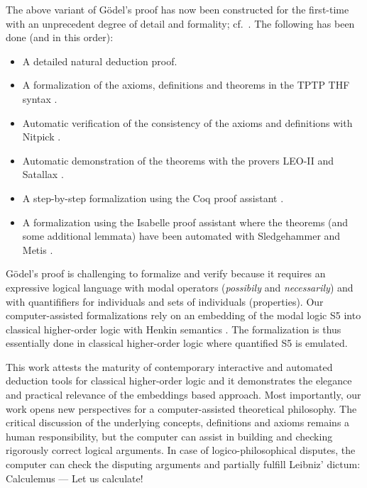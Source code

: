 \documentclass{llncs}
\begin{document}

The above variant of G\"{o}del's proof has now been 
constructed for the first-time
with an unprecedent degree of detail and formality; cf.~\cite{FormalTheologyRepository}. The following has been done (and in this order):
\begin{itemize}
\item A detailed natural deduction proof.
%
\item A formalization of the axioms, definitions and theorems in the TPTP THF syntax \cite{J22}.
%
\item Automatic verification of the consistency of the axioms and 
definitions with Nitpick \cite{Nitpick}.
%
\item Automatic demonstration of the theorems with the provers LEO-II \cite{LEO-II} and Satallax \cite{Satallax}.

\item A step-by-step formalization using the Coq proof assistant \cite{Coq}.

\item A formalization using the Isabelle proof assistant \cite{Isabelle} where the theorems (and some additional lemmata) have been automated with Sledgehammer \cite{Sledgehammer} and Metis \cite{Hurd03first-orderproof}.
\end{itemize}

G\"{o}del's proof is challenging to formalize and verify because it
requires an expressive logical language with modal operators
(\emph{possibily} and \emph{necessarily}) and with
quantififiers for individuals and sets of individuals (properties).  Our computer-assisted formalizations rely on an
embedding of the modal logic S5 into classical higher-order logic with
Henkin semantics \cite{J23,B9}. The formalization is thus essentially
done in classical higher-order logic where quantified S5 is emulated.

This work attests the maturity of contemporary interactive and
automated deduction tools for classical higher-order logic and it
demonstrates the elegance and practical relevance of the embeddings
based approach.  Most importantly, our work opens new perspectives for
a computer-assisted theoretical philosophy.  The critical discussion
of the underlying concepts, definitions and axioms remains a human
responsibility, but the computer can assist in building and checking
rigorously correct logical arguments. In case of logico-philosophical
disputes, the computer can check the disputing arguments and partially
fulfill Leibniz' dictum: Calculemus --- Let us calculate!
\end{document}
